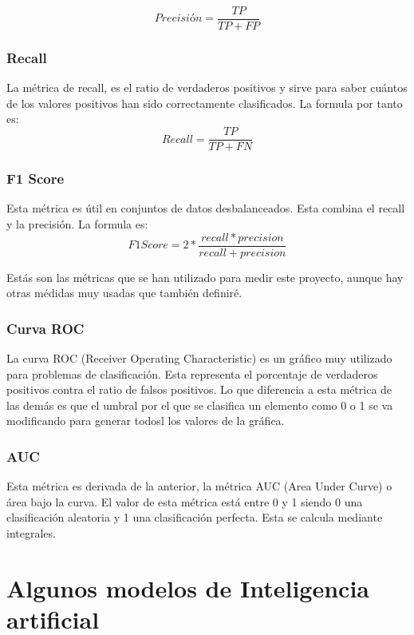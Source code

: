 \begin{equation}
	Precisión=\frac{TP}{TP+FP}
\end{equation}

\subsubsection{Recall}
La métrica de recall, es el ratio de verdaderos positivos y sirve para saber cuántos de los valores positivos han sido correctamente clasificados. La formula por tanto es:
\begin{equation}
	Recall=\frac{TP}{TP+FN}
\end{equation}

\subsubsection{F1 Score}
Esta métrica es útil en conjuntos de datos desbalanceados. Esta combina el recall y la precisión. La formula es:
\begin{equation}
	F1 Score=2*\frac{recall*precision}{recall+precision}
\end{equation}

Estás son las métricas que se han utilizado para medir este proyecto, aunque hay otras médidas muy usadas que también definiré.

\subsubsection{Curva ROC}
La curva ROC (Receiver Operating Characteristic) es un gráfico muy utilizado para problemas de clasificación. Esta representa el porcentaje de verdaderos positivos contra el ratio de falsos positivos. Lo que diferencia a esta métrica de las demás es que el umbral por el que se clasifica un elemento como 0 o 1 se va modificando para generar todosl los valores de la gráfica.

\subsubsection{AUC}
Esta métrica es derivada de la anterior, la métrica AUC (Area Under Curve) o área bajo la curva. El valor de esta métrica está entre 0 y 1 siendo 0 una clasificación aleatoria y 1 una clasificación perfecta. Esta se calcula mediante integrales.

\section{Algunos modelos de Inteligencia artificial}

